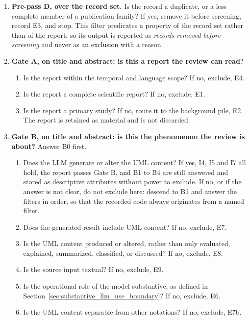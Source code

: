 \begin{enumerate}[label=\textbf{Step \arabic*.},leftmargin=*,itemsep=0.4em]

    \item \textbf{Pre-pass D, over the record set.} Is the record a duplicate, or a less complete member of a publication family? If yes, remove it before screening, record E3, and stop. This filter predicates a property of the record set rather than of the report, so its output is reported as \textit{records removed before screening} and never as an exclusion with a reason.

    \item \textbf{Gate A, on title and abstract: is this a report the review can read?}
    \begin{enumerate}[label=A\arabic*.,leftmargin=2em]
        \item Is the report within the temporal and language scope? If no, exclude, E4.
        \item Is the report a complete scientific report? If no, exclude, E1.
        \item Is the report a primary study? If no, route it to the background pile, E2. The report is retained as material and is not discarded.
    \end{enumerate}

    \item \textbf{Gate B, on title and abstract: is this the phenomenon the review is about?} Answer B0 first.
    \begin{enumerate}[label=B\arabic*.,leftmargin=2em,start=0]
        \item Does the LLM generate or alter the UML content? If yes, I4, I5 and I7 all hold, the report passes Gate B, and B1 to B4 are still answered and stored as descriptive attributes without power to exclude. If no, or if the answer is not clear, do not exclude here: descend to B1 and answer the filters in order, so that the recorded code always originates from a named filter.
        \item Does the generated result include UML content? If no, exclude, E7.
        \item Is the UML content produced or altered, rather than only evaluated, explained, summarized, classified, or discussed? If no, exclude, E8.
        \item Is the source input textual? If no, exclude, E9.
        \item Is the operational role of the model substantive, as defined in Section~\ref{sec:substantive_llm_use_boundary}? If no, exclude, E6.
        \item Is the UML content separable from other notations? If no, exclude, E7b.
    \end{enumerate}


\end{enumerate}

